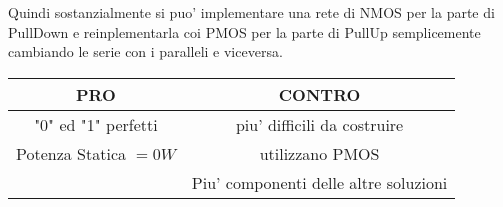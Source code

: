 \documentclass[\main/main.tex]{subfiles}
\begin{document}
Quindi sostanzialmente si puo' implementare una rete di NMOS per la parte di PullDown e reinplementarla coi PMOS per la parte di PullUp semplicemente cambiando le serie con i paralleli e viceversa.

\begin{center}
	\begin{tabular}{ c | c }
		PRO                    & CONTRO                                \\
		\hline
		"0" ed "1" perfetti    & piu' difficili da costruire           \\
		Potenza Statica $= 0W$ & utilizzano PMOS                       \\
		                       & Piu' componenti delle altre soluzioni \\
	\end{tabular}
\end{center}

\clearpage
\end{document}
